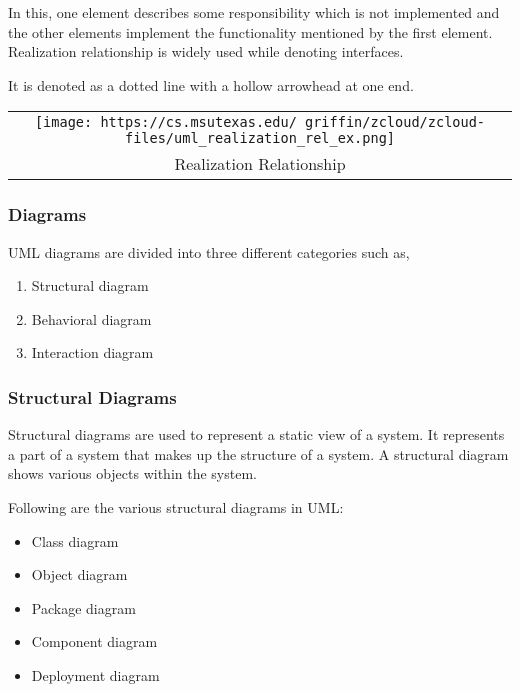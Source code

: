 \documentclass[
]{article}
\providecommand{\tightlist}{%
  \setlength{\itemsep}{0pt}\setlength{\parskip}{0pt}}
\begin{document}
In this, one element describes some responsibility which is not
implemented and the other elements implement the functionality mentioned
by the first element. Realization relationship is widely used while
denoting interfaces.

It is denoted as a dotted line with a hollow arrowhead at one end.

\begin{longtable}[]{@{}c@{}}
\toprule
\endhead
\texttt{[image: https://cs.msutexas.edu/~griffin/zcloud/zcloud-files/uml\_realization\_rel\_ex.png]}\tabularnewline
Realization Relationship\tabularnewline
\bottomrule
\end{longtable}

\hypertarget{diagrams}{%
\subsubsection{Diagrams}\label{diagrams}}

UML diagrams are divided into three different categories such as,

\begin{enumerate}
\def\labelenumi{\arabic{enumi}.}
\tightlist
\item
  Structural diagram
\item
  Behavioral diagram
\item
  Interaction diagram
\end{enumerate}

\hypertarget{structural-diagrams-1}{%
\subsubsection{Structural Diagrams}\label{structural-diagrams-1}}

Structural diagrams are used to represent a static view of a system. It
represents a part of a system that makes up the structure of a system. A
structural diagram shows various objects within the system.

Following are the various structural diagrams in UML:

\begin{itemize}
\tightlist
\item
  Class diagram
\item
  Object diagram
\item
  Package diagram
\item
  Component diagram
\item
  Deployment diagram
\end{itemize}
\end{document}
